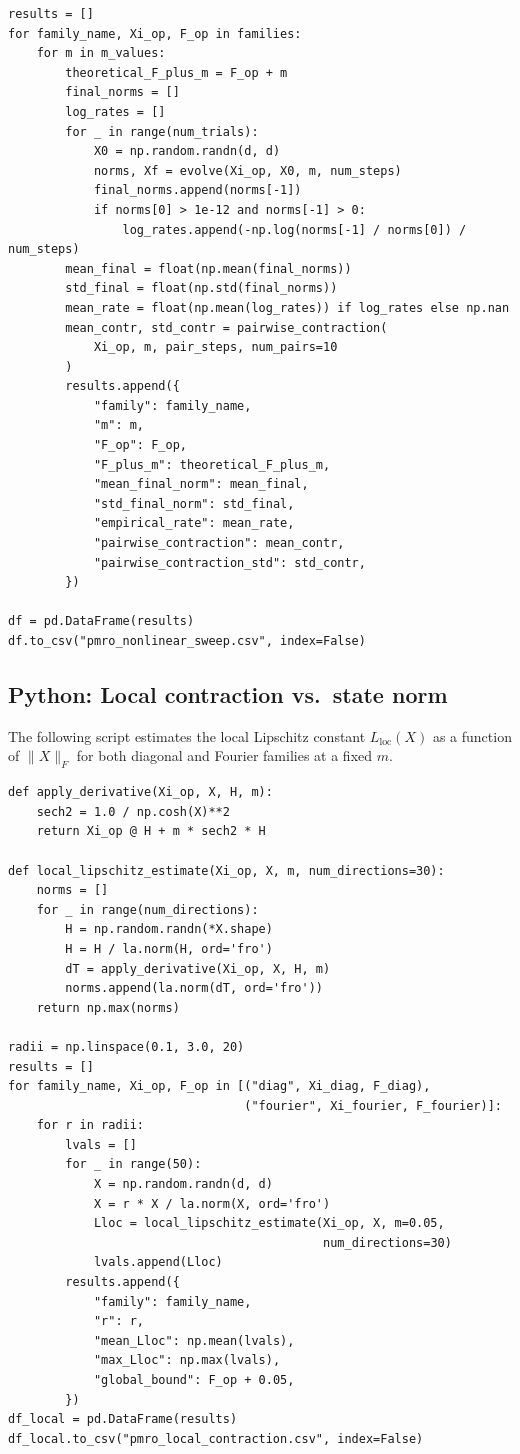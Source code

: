 \documentclass[11pt]{article}
\begin{document}
\begin{verbatim}
results = []
for family_name, Xi_op, F_op in families:
    for m in m_values:
        theoretical_F_plus_m = F_op + m
        final_norms = []
        log_rates = []
        for _ in range(num_trials):
            X0 = np.random.randn(d, d)
            norms, Xf = evolve(Xi_op, X0, m, num_steps)
            final_norms.append(norms[-1])
            if norms[0] > 1e-12 and norms[-1] > 0:
                log_rates.append(-np.log(norms[-1] / norms[0]) / num_steps)
        mean_final = float(np.mean(final_norms))
        std_final = float(np.std(final_norms))
        mean_rate = float(np.mean(log_rates)) if log_rates else np.nan
        mean_contr, std_contr = pairwise_contraction(
            Xi_op, m, pair_steps, num_pairs=10
        )
        results.append({
            "family": family_name,
            "m": m,
            "F_op": F_op,
            "F_plus_m": theoretical_F_plus_m,
            "mean_final_norm": mean_final,
            "std_final_norm": std_final,
            "empirical_rate": mean_rate,
            "pairwise_contraction": mean_contr,
            "pairwise_contraction_std": std_contr,
        })

df = pd.DataFrame(results)
df.to_csv("pmro_nonlinear_sweep.csv", index=False)
\end{verbatim}

\subsection{Python: Local contraction vs.\ state norm}

The following script estimates the local Lipschitz constant $L_{\text{loc}}(X)$ as a function of $\|X\|_F$ for both diagonal and Fourier families at a fixed $m$.

\begin{verbatim}
def apply_derivative(Xi_op, X, H, m):
    sech2 = 1.0 / np.cosh(X)**2
    return Xi_op @ H + m * sech2 * H

def local_lipschitz_estimate(Xi_op, X, m, num_directions=30):
    norms = []
    for _ in range(num_directions):
        H = np.random.randn(*X.shape)
        H = H / la.norm(H, ord='fro')
        dT = apply_derivative(Xi_op, X, H, m)
        norms.append(la.norm(dT, ord='fro'))
    return np.max(norms)

radii = np.linspace(0.1, 3.0, 20)
results = []
for family_name, Xi_op, F_op in [("diag", Xi_diag, F_diag),
                                 ("fourier", Xi_fourier, F_fourier)]:
    for r in radii:
        lvals = []
        for _ in range(50):
            X = np.random.randn(d, d)
            X = r * X / la.norm(X, ord='fro')
            Lloc = local_lipschitz_estimate(Xi_op, X, m=0.05,
                                            num_directions=30)
            lvals.append(Lloc)
        results.append({
            "family": family_name,
            "r": r,
            "mean_Lloc": np.mean(lvals),
            "max_Lloc": np.max(lvals),
            "global_bound": F_op + 0.05,
        })
df_local = pd.DataFrame(results)
df_local.to_csv("pmro_local_contraction.csv", index=False)
\end{verbatim}
\end{document}
